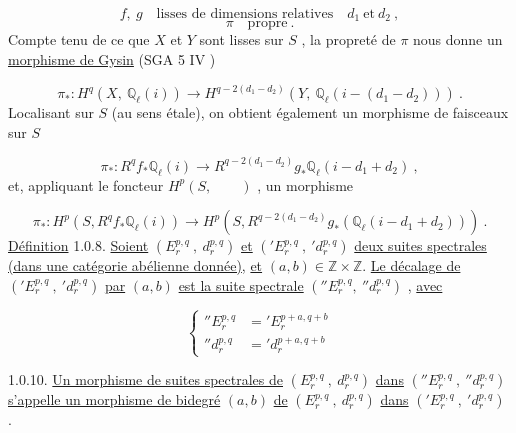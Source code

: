 
\begin{equation}\tag{1.0.3}
f,\ g \quad \text{lisses de dimensions relatives} \quad d_1 \ \text{et} \ d_2 \ ,
\end{equation}
\begin{equation}\tag{1.0.4}
\pi \quad \text{propre} \ .
\end{equation}
Compte tenu de ce que $X$ et $Y$ sont lisses sur $S$ , la propreté de $\pi$ nous donne un \underline{morphisme de Gysin} (SGA 5 IV \qquad )

\begin{equation}\tag{1.0.5}
\pi_* : H^q(X,\ \mathbb{Q}_\ell(i)) \longrightarrow H^{q-2(d_1-d_2)}(Y,\ \mathbb{Q}_\ell(i-(d_1-d_2))) \ .
\end{equation}
Localisant sur $S$ (au sens étale), on obtient également un morphisme de faisceaux sur $S$

\begin{equation}\tag{1.0.6}
\pi_* : R^q f_*\mathbb{Q}_\ell(i) \longrightarrow R^{q-2(d_1-d_2)} g_*\mathbb{Q}_\ell(i-d_1+d_2) \ ,
\end{equation}
et, appliquant le foncteur $H^p(S, \qquad )$ , un morphisme

\begin{equation}\tag{1.0.7}
\pi_*: H^p(S,R^q f_*\mathbb{Q}_\ell(i)) \longrightarrow H^p(S,R^{q-2(d_1-d_2)} g_*(\mathbb{Q}_\ell(i-d_1+d_2))) \ .
\end{equation}
\underline{Définition} 1.0.8. \underline{Soient} $(E_r^{p,q}\ ,\ d_r^{p,q})$ \underline{et} $({}'E_r^{p,q}\ ,\ {}'d_r^{p,q})$ \underline{deux suites spectrales (dans une catégorie abélienne donnée)}, \underline{et} $(a, b) \in \mathbb{Z} \times \mathbb{Z}$. \underline{Le décalage de} $({}'E_r^{p,q}\ ,\ {}'d_r^{p,q})$ \underline{par} $(a, b)$ \underline{est la suite spectrale} $({}''E_r^{p,q},\ {}''d_r^{p,q})$ , \underline{avec}

\begin{equation}\tag{1.0.9}
\left\{
\begin{aligned}
{}''E_r^{p,q} &= {}'E_r^{p+a,q+b} \\
{}''d_r^{p,q} &= {}'d_r^{p+a,q+b}
\end{aligned}
\right.
\end{equation}


1.0.10. \underline{Un morphisme de suites spectrales de} $(E_r^{p,q}\ ,\ d_r^{p,q})$ \underline{dans} $({}''E_r^{p,q}\ ,\ {}''d_r^{p,q})$ \underline{s'appelle un morphisme de bidegré} $(a, b)$ \underline{de} $(E_r^{p,q}\ ,\ d_r^{p,q})$ \underline{dans} $({}'E_r^{p,q}\ ,\ {}'d_r^{p,q})$ .

